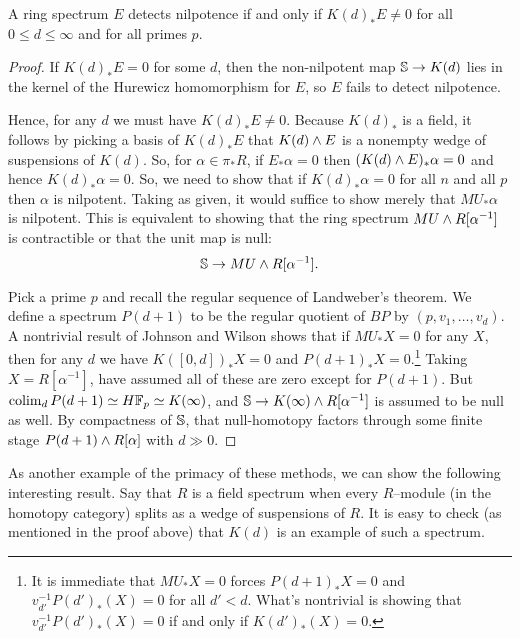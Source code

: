 \begin{corollary}
A ring spectrum $E$ detects nilpotence if and only if $K(d)_* E \ne 0$ for all $0 \le d \le \infty$ and for all primes $p$.
\end{corollary}
\begin{proof}
If $K(d)_* E = 0$ for some $d$, then the non-nilpotent map $\S \to K(d)$ lies in the kernel of the Hurewicz homomorphism for $E$, so $E$ fails to detect nilpotence.

Hence, for any $d$ we must have $K(d)_* E \ne 0$.  Because $K(d)_*$ is a field, it follows by picking a basis of $K(d)_* E$ that $K(d) \sm E$ is a nonempty wedge of suspensions of $K(d)$.  So, for $\alpha \in \pi_* R$, if $E_* \alpha = 0$ then $(K(d) \sm E)_* \alpha = 0$ and hence $K(d)_* \alpha = 0$.  So, we need to show that if $K(d)_* \alpha = 0$ for all $n$ and all $p$ then $\alpha$ is nilpotent.  Taking  as given, it would suffice to show merely that $MU_* \alpha$ is nilpotent.  This is equivalent to showing that the ring spectrum $MU \sm R[\alpha^{-1}]$ is contractible or that the unit map is null: \[\S \to MU \sm R[\alpha^{-1}].\]

Pick a prime $p$ and recall the regular sequence of Landweber's theorem.  We define a spectrum $P(d+1)$ to be the regular quotient of $BP$ by $(p, v_1, \ldots, v_d)$.  A nontrivial result of Johnson and Wilson shows that if $MU_* X = 0$ for any $X$, then for any $d$ we have $K([0, d])_* X = 0$ and $P(d+1)_* X = 0$.\footnote{It is immediate that $MU_* X = 0$ forces $P(d+1)_* X = 0$ and $v_{d'}^{-1} P(d')_*(X) = 0$ for all $d' < d$.  What's nontrivial is showing that $v_{d'}^{-1} P(d')_*(X) = 0$ if and only if $K(d')_*(X) = 0$.}  Taking $X = R[\alpha^{-1}]$, have assumed all of these are zero except for $P(d+1)$.  But $\colim_d P(d+1) \simeq H\F_p \simeq K(\infty)$, and $\S \to K(\infty) \sm R[\alpha^{-1}]$ is assumed to be null as well.  By compactness of $\S$, that null-homotopy factors through some finite stage $P(d+1) \sm R[\alpha]$ with $d \gg 0$.
\end{proof}

As another example of the primacy of these methods, we can show the following interesting result.  Say that $R$ is a field spectrum when every $R$--module (in the homotopy category) splits as a wedge of suspensions of $R$.  It is easy to check (as mentioned in the proof above) that $K(d)$ is an example of such a spectrum.

